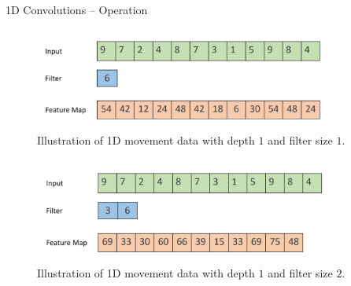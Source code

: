 \begin{vbframe}{1D Convolutions -- Operation}
    \begin{figure}
        \centering
        \includegraphics[width=10cm]{plots/1dconv.png}
        \caption{Illustration of 1D movement data with depth $1$ and filter size $1$. }
    \end{figure}
\framebreak
    \begin{figure}
        \centering
        \includegraphics[width=10cm]{plots/1dconv2.png}
        \caption{Illustration of 1D movement data with depth $1$ and filter size $2$. }
    \end{figure}
\end{vbframe}

